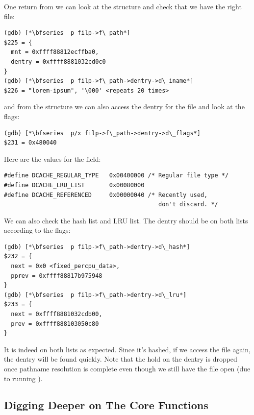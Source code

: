 \noindent
One return from  we can look at the  structure and check that we have the right file:

\begin{lstlisting}
(gdb) [*\bfseries  p filp->f\_path*]
$225 = {
  mnt = 0xffff88812ecffba0,
  dentry = 0xffff8881032cd0c0
}
(gdb) [*\bfseries  p filp->f\_path->dentry->d\_iname*]
$226 = "lorem-ipsum", '\000' <repeats 20 times>
\end{lstlisting}

\noindent
and from the  structure we can also access the dentry for the file and look at the flags:

\begin{lstlisting}
(gdb) [*\bfseries  p/x filp->f\_path->dentry->d\_flags*]
$231 = 0x480040
\end{lstlisting}

\noindent
Here are the values for the  field:

\begin{lstlisting}
#define DCACHE_REGULAR_TYPE   0x00400000 /* Regular file type */
#define DCACHE_LRU_LIST       0x00080000
#define DCACHE_REFERENCED     0x00000040 /* Recently used, 
                                            don't discard. */
\end{lstlisting}

\noindent
We can also check the hash list and LRU list. The dentry should be on both lists according to the flags:

\begin{lstlisting}
(gdb) [*\bfseries  p filp->f\_path->dentry->d\_hash*]
$232 = {
  next = 0x0 <fixed_percpu_data>,
  pprev = 0xffff88817b975948
}
(gdb) [*\bfseries  p filp->f\_path->dentry->d\_lru*]
$233 = {
  next = 0xffff8881032cdb00,
  prev = 0xffff888103050c80
}
\end{lstlisting}

\noindent
It is indeed on both lists as expected. Since it's hashed, if we access the file again, the dentry will be found quickly. Note that the hold on the dentry is dropped once pathname resolution is complete even though we still have the file open (due to running ).


\subsection{Digging Deeper on The Core Functions}

